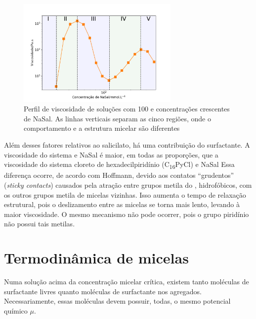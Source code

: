 		\begin{figure}[h]
			\centering
			\includegraphics[width=0.7\textwidth]{imagens/reologia/regioes_RH}
			\caption{Perfil de viscosidade de soluções com \CTAB{} 100 \mM{} e concentrações crescentes de NaSal. As linhas verticais separam as cinco regiões, onde o comportamento e a estrutura micelar são diferentes}
			\label{fig:regioes_rh}
		\end{figure}

		Além desses fatores relativos ao salicilato, há uma contribuição do surfactante. A viscosidade do sistema \CTAB{} e NaSal é maior, em todas as proporções, que a viscosidade do sistema cloreto de hexadecilpiridínio (C\textsubscript{16}PyCl) e NaSal %
		Essa diferença ocorre, de acordo com Hoffmann, %
		devido aos contatos ``grudentos'' (\emph{sticky contacts}) causados pela atração entre grupos metila do \CTAB, hidrofóbicos, com os outros grupos metila de micelas vizinhas. Isso aumenta o tempo de relaxação estrutural, pois o deslizamento entre as micelas se torna mais lento, levando à maior viscosidade. O mesmo mecanismo não pode ocorrer, pois o grupo piridínio não possui tais metilas.  
		
		
		\section{Termodinâmica de micelas} 
		
		Numa solução acima da concentração micelar crítica, existem tanto moléculas de surfactante livres quanto moléculas de surfactante nos agregados. Necessariamente, essas moléculas devem possuir, todas, o mesmo potencial químico \(\mu\). %
		
